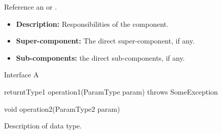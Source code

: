 \documentclass[a4paper,10pt]{article}
\begin{document}
Reference an  or .


\begin{itemize}
    \item \textbf{Description:} Responsibilities of the component.
    \item \textbf{Super-component:} The direct super-component, if any.
    \item \textbf{Sub-components:} the direct sub-components, if any.
\end{itemize}

\begin{interfaces}
    \begin{interface}{Interface A}
        \begin{method}{returntType1 operation1(ParamType param) throws SomeException}
            \begin{exceptions}
            \end{exceptions}
        \end{method}
        \begin{method}{void operation2(ParamType2 param)}
            \noexc
        \end{method}
    \end{interface}
\end{interfaces}

\newpage
\begin{itemize}
     Description of data type.
\end{itemize}

\newpage
\printindex[elements]
\printindex[datatypes]
\end{document}
